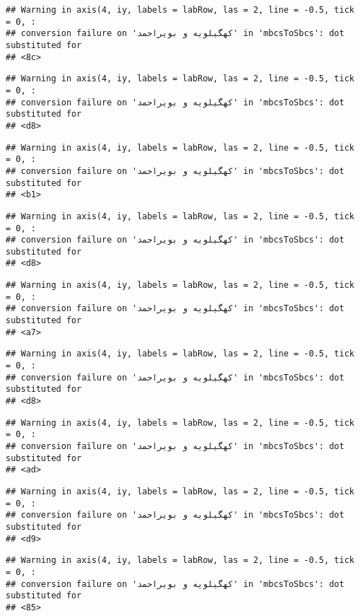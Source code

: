 \documentclass[
]{article}
\begin{document}
\begin{verbatim}
## Warning in axis(4, iy, labels = labRow, las = 2, line = -0.5, tick = 0, :
## conversion failure on 'کهگیلویه و بویراحمد' in 'mbcsToSbcs': dot substituted for
## <8c>
\end{verbatim}

\begin{verbatim}
## Warning in axis(4, iy, labels = labRow, las = 2, line = -0.5, tick = 0, :
## conversion failure on 'کهگیلویه و بویراحمد' in 'mbcsToSbcs': dot substituted for
## <d8>
\end{verbatim}

\begin{verbatim}
## Warning in axis(4, iy, labels = labRow, las = 2, line = -0.5, tick = 0, :
## conversion failure on 'کهگیلویه و بویراحمد' in 'mbcsToSbcs': dot substituted for
## <b1>
\end{verbatim}

\begin{verbatim}
## Warning in axis(4, iy, labels = labRow, las = 2, line = -0.5, tick = 0, :
## conversion failure on 'کهگیلویه و بویراحمد' in 'mbcsToSbcs': dot substituted for
## <d8>
\end{verbatim}

\begin{verbatim}
## Warning in axis(4, iy, labels = labRow, las = 2, line = -0.5, tick = 0, :
## conversion failure on 'کهگیلویه و بویراحمد' in 'mbcsToSbcs': dot substituted for
## <a7>
\end{verbatim}

\begin{verbatim}
## Warning in axis(4, iy, labels = labRow, las = 2, line = -0.5, tick = 0, :
## conversion failure on 'کهگیلویه و بویراحمد' in 'mbcsToSbcs': dot substituted for
## <d8>
\end{verbatim}

\begin{verbatim}
## Warning in axis(4, iy, labels = labRow, las = 2, line = -0.5, tick = 0, :
## conversion failure on 'کهگیلویه و بویراحمد' in 'mbcsToSbcs': dot substituted for
## <ad>
\end{verbatim}

\begin{verbatim}
## Warning in axis(4, iy, labels = labRow, las = 2, line = -0.5, tick = 0, :
## conversion failure on 'کهگیلویه و بویراحمد' in 'mbcsToSbcs': dot substituted for
## <d9>
\end{verbatim}

\begin{verbatim}
## Warning in axis(4, iy, labels = labRow, las = 2, line = -0.5, tick = 0, :
## conversion failure on 'کهگیلویه و بویراحمد' in 'mbcsToSbcs': dot substituted for
## <85>
\end{verbatim}
\end{document}
